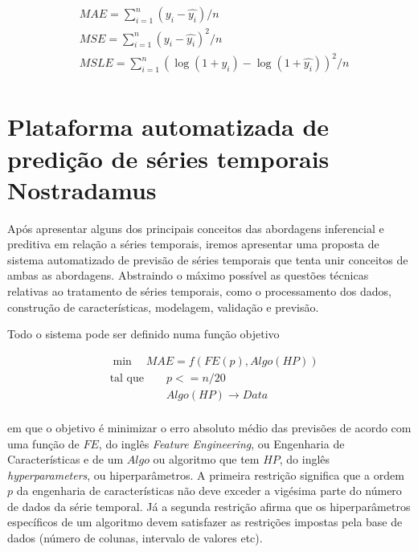 \documentclass[twocolumn]{rbef}
\newcommand{\1}{\mathbbm{1}}
\begin{document}
\begin{equation} \label{mineq}
    \begin{split}
        & MAE = \sum_{i=1}^{n} (y_{i} - \hat{y_{i}}) / n \\
        & MSE = \sum_{i=1}^{n} (y_{i} - \hat{y_{i}})^2 / n \\
        & MSLE = \sum_{i=1}^{n} (\log(1 + y_{i}) - \log(1 + \hat{y_{i}}))^2 / n \\
    \end{split}
\end{equation}

\section{Plataforma automatizada de predição de séries temporais Nostradamus} \label{nostradamus}

Após apresentar alguns dos principais conceitos das abordagens inferencial e preditiva em relação a séries temporais, iremos apresentar uma proposta de sistema automatizado de previsão de séries temporais que tenta unir conceitos de ambas as abordagens. Abstraindo o máximo possível as questões técnicas relativas ao tratamento de séries temporais, como o processamento dos dados, construção de características, modelagem, validação e previsão.

Todo o sistema pode ser definido numa função objetivo

\begin{equation}
    \begin{split}
        & \min \quad MAE = f(FE(p), Algo(HP)) \\
        & \text{tal que} \qquad p <= n / 20 \\
        & \qquad \qquad \quad Algo(HP) \to Data \\
    \end{split}
\end{equation}

em que o objetivo é minimizar o erro absoluto médio das previsões de acordo com uma função de $FE$, do inglês \textit{Feature Engineering}, ou Engenharia de Características e de um $Algo$ ou algoritmo que tem $HP$, do inglês \textit{hyperparameters}, ou hiperparâmetros. A primeira restrição significa que a ordem $p$ da engenharia de características não deve exceder a vigésima parte do número de dados da série temporal. Já a segunda restrição afirma que os hiperparâmetros específicos de um algoritmo devem satisfazer as restrições impostas pela base de dados (número de colunas, intervalo de valores etc).
\end{document}
